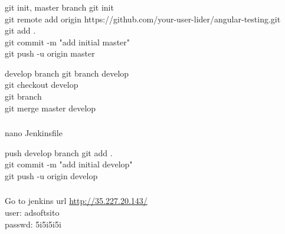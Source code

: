 \documentclass{beamer}
\begin{document}
\begin{frame}\frametitle{} 

\begin{block}{git init, master branch}
git init \\
git remote add origin https://github.com/your-user-lider/angular-testing.git \\
git add . \\

git commit -m "add initial master" \\
git push -u origin master
\end{block}

\begin{block}{develop branch}
git branch develop \\
git checkout develop \\
git branch \\
git merge master develop 
\end{block}

\end{frame}


\begin{frame}\frametitle{} 

\begin{block}{nano Jenkinsfile}
\lstjenkins
\end{block}

\begin{block}{push develop branch}
git add . \\
git commit -m "add initial develop" \\
git push -u origin develop
\end{block}

\end{frame}




\begin{frame}\frametitle{} 

\begin{block}{Go to jenkins url}
\url{http://35.227.20.143/} \\
user:  adsoftsito \\
passwd:  5i5i5i5i

\end{block}

\end{frame}
\end{document}
